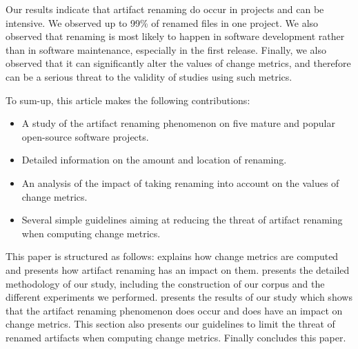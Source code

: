 Our results indicate that artifact renaming do occur in projects and can be intensive. We observed up to 99\% of renamed files in one project. We also observed that renaming is most likely to happen in software development rather than in software maintenance, especially in the first release. Finally, we also observed that it can significantly alter the values of change metrics, and therefore can be a serious threat to the validity of studies using such metrics.

To sum-up, this article makes the following contributions:
\begin{itemize}
	\item A study of the artifact renaming phenomenon on five mature and popular open-source software projects.
	\item Detailed information on the amount and location of renaming.
	\item An analysis of the impact of taking renaming into account on the values of change metrics.
	\item Several simple guidelines aiming at reducing the threat of artifact renaming when computing change metrics.
\end{itemize}

This paper is structured as follows:  explains how change metrics are computed and presents how artifact renaming has an impact on them.  presents the detailed methodology of our study, including the construction of our corpus and the different experiments we performed.  presents the results of our study which shows that the artifact renaming phenomenon does occur and does have an impact on change metrics. This section also presents our guidelines to limit the threat of renamed artifacts when computing change metrics. Finally  concludes this paper.





